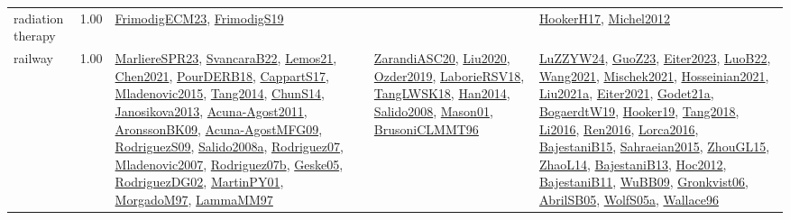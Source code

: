 {\begin{longtable}{p{3cm}r>{\raggedright\arraybackslash}p{6cm}>{\raggedright\arraybackslash}p{6cm}>{\raggedright\arraybackslash}p{8cm}}
\index{radiation therapy}\index{ApplicationAreas!radiation therapy}radiation therapy &  1.00 & \hyperref[detail:FrimodigECM23]{FrimodigECM23}, \hyperref[detail:FrimodigS19]{FrimodigS19} &  & \hyperref[detail:HookerH17]{HookerH17}, \hyperref[detail:Michel2012]{Michel2012}\\
\index{railway}\index{ApplicationAreas!railway}railway &  1.00 & \hyperref[detail:MarliereSPR23]{MarliereSPR23}, \hyperref[detail:SvancaraB22]{SvancaraB22}, \hyperref[detail:Lemos21]{Lemos21}, \hyperref[detail:Chen2021]{Chen2021}, \hyperref[detail:PourDERB18]{PourDERB18}, \hyperref[detail:CappartS17]{CappartS17}, \hyperref[detail:Mladenovic2015]{Mladenovic2015}, \hyperref[detail:Tang2014]{Tang2014}, \hyperref[detail:ChunS14]{ChunS14}, \hyperref[detail:Janosikova2013]{Janosikova2013}, \hyperref[detail:Acuna-Agost2011]{Acuna-Agost2011}, \hyperref[detail:AronssonBK09]{AronssonBK09}, \hyperref[detail:Acuna-AgostMFG09]{Acuna-AgostMFG09}, \hyperref[detail:RodriguezS09]{RodriguezS09}, \hyperref[detail:Salido2008a]{Salido2008a}, \hyperref[detail:Rodriguez07]{Rodriguez07}, \hyperref[detail:Mladenovic2007]{Mladenovic2007}, \hyperref[detail:Rodriguez07b]{Rodriguez07b}, \hyperref[detail:Geske05]{Geske05}, \hyperref[detail:RodriguezDG02]{RodriguezDG02}, \hyperref[detail:MartinPY01]{MartinPY01}, \hyperref[detail:MorgadoM97]{MorgadoM97}, \hyperref[detail:LammaMM97]{LammaMM97} & \hyperref[detail:ZarandiASC20]{ZarandiASC20}, \hyperref[detail:Liu2020]{Liu2020}, \hyperref[detail:Ozder2019]{Ozder2019}, \hyperref[detail:LaborieRSV18]{LaborieRSV18}, \hyperref[detail:TangLWSK18]{TangLWSK18}, \hyperref[detail:Han2014]{Han2014}, \hyperref[detail:Salido2008]{Salido2008}, \hyperref[detail:Mason01]{Mason01}, \hyperref[detail:BrusoniCLMMT96]{BrusoniCLMMT96} & \hyperref[detail:LuZZYW24]{LuZZYW24}, \hyperref[detail:GuoZ23]{GuoZ23}, \hyperref[detail:Eiter2023]{Eiter2023}, \hyperref[detail:LuoB22]{LuoB22}, \hyperref[detail:Wang2021]{Wang2021}, \hyperref[detail:Mischek2021]{Mischek2021}, \hyperref[detail:Hosseinian2021]{Hosseinian2021}, \hyperref[detail:Liu2021a]{Liu2021a}, \hyperref[detail:Eiter2021]{Eiter2021}, \hyperref[detail:Godet21a]{Godet21a}, \hyperref[detail:BogaerdtW19]{BogaerdtW19}, \hyperref[detail:Hooker19]{Hooker19}, \hyperref[detail:Tang2018]{Tang2018}, \hyperref[detail:Li2016]{Li2016}, \hyperref[detail:Ren2016]{Ren2016}, \hyperref[detail:Lorca2016]{Lorca2016}, \hyperref[detail:BajestaniB15]{BajestaniB15}, \hyperref[detail:Sahraeian2015]{Sahraeian2015}, \hyperref[detail:ZhouGL15]{ZhouGL15}, \hyperref[detail:ZhaoL14]{ZhaoL14}, \hyperref[detail:BajestaniB13]{BajestaniB13}, \hyperref[detail:Hoc2012]{Hoc2012}, \hyperref[detail:BajestaniB11]{BajestaniB11}, \hyperref[detail:WuBB09]{WuBB09}, \hyperref[detail:Gronkvist06]{Gronkvist06}, \hyperref[detail:AbrilSB05]{AbrilSB05}, \hyperref[detail:WolfS05a]{WolfS05a}, \hyperref[detail:Wallace96]{Wallace96}\\

\end{longtable}}
